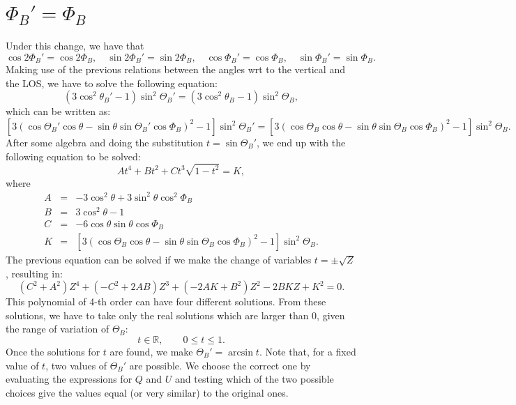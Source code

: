 \documentclass[12pt]{article}
\begin{document}
\section{\texorpdfstring{$\Phi_B' = \Phi_B$}{PhiB'=PhiB}}
Under this change, we have that
\begin{equation}
\cos 2\Phi_B' = \cos 2\Phi_B, \quad \sin 2\Phi_B' = \sin 2\Phi_B, \quad \cos \Phi_B' = \cos \Phi_B, \quad \sin \Phi_B' = \sin \Phi_B.
\end{equation}
Making use of the previous relations between the angles wrt to the vertical and the LOS, we have to solve the 
following equation:
\begin{equation}
\left( 3 \cos^2\theta_B'-1 \right) \sin^2 \Theta_B' = \left( 3 \cos^2\theta_B-1 \right) \sin^2 \Theta_B,
\end{equation}
which can be written as:
\begin{equation}
\left[ 3 \left( \cos \Theta_B' \cos \theta - \sin\theta \sin\Theta_B' \cos\Phi_B\right)^2-1 \right] \sin^2 \Theta_B' = 
\left[ 3 \left( \cos \Theta_B \cos \theta - \sin\theta \sin\Theta_B \cos\Phi_B\right)^2-1 \right] \sin^2 \Theta_B.
\end{equation}
After some algebra and doing the substitution $t=\sin\Theta_B'$, we end up with the following equation to be
solved:
\begin{equation}
A t^4 + Bt^2 + C t^3 \sqrt{1-t^2} = K,
\end{equation}
where
\begin{eqnarray}
A &=& -3\cos^2 \theta + 3\sin^2 \theta \cos^2 \Phi_B \nonumber \\
B &=& 3\cos^2 \theta - 1 \nonumber \\
C &=& -6 \cos\theta \sin\theta \cos \Phi_B \nonumber \\
K &=& \left[ 3 \left( \cos \Theta_B \cos \theta - \sin\theta \sin\Theta_B \cos\Phi_B\right)^2-1 \right] \sin^2 \Theta_B.
\end{eqnarray}
The previous equation can be solved if we make the change of variables $t=\pm \sqrt{Z}$, resulting in:
\begin{equation}
(C^2+A^2) Z^4 + (-C^2+2AB) Z^3 + (-2AK+B^2) Z^2 - 2BKZ + K^2 = 0.
\end{equation}
This polynomial of 4-th order can have four different solutions. From these solutions, we have to take only
the real solutions which are larger than 0, given the range of variation of $\Theta_B$:
\begin{equation}
t \in \mathbb{R}, \qquad 0 \leq t \leq 1.
\end{equation}
Once the solutions for $t$ are found, we make $\Theta_B' = \arcsin t$. Note that, for a fixed value of $t$,
two values of $\Theta_B'$ are possible. We choose the correct one by evaluating the expressions for 
$Q$ and $U$ and testing which of the two possible choices give the values equal (or very similar) to the original ones.
\end{document}
